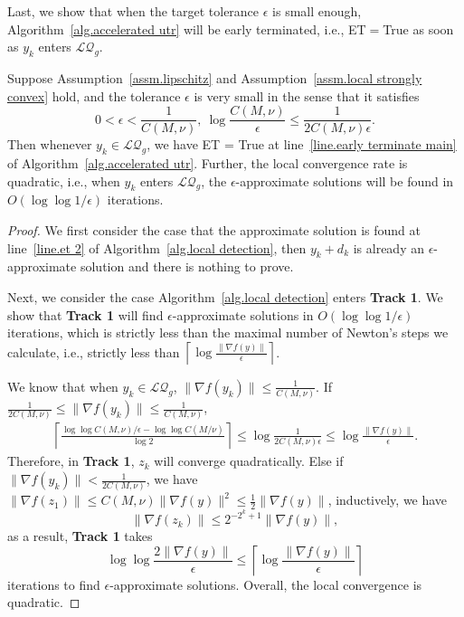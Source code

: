 \documentclass{mcom-l}
\numberwithin{equation}{section}
\begin{document}
Last, we show that when the target tolerance $\epsilon$ is small enough, Algorithm~\ref{alg.accelerated utr} will be early terminated, i.e., ET$=$True as soon as $y_k$ enters $\mathcal{LQ}_g$.
\begin{theorem}
    \label{thm.local quadratic convergence}
    Suppose Assumption~\ref{assm.lipschitz} and Assumption~\ref{assm.local strongly convex} hold, and the tolerance $\epsilon$ is very small in the sense that it satisfies
    \begin{equation}
        \label{eq.regularity epsilon}
        0<\epsilon< \frac{1}{C(M,\nu)}, \ \log\frac{C(M,\nu)}{\epsilon}\leq \frac{1}{2C(M,\nu)\epsilon}.
    \end{equation}
    Then whenever $y_k\in\mathcal{LQ}_g$, we have ET = True at line~\ref{line.early terminate main} of Algorithm~\ref{alg.accelerated utr}. Further, the local convergence rate is quadratic, i.e., when $y_k$ enters $\mathcal{LQ}_g$, the $\epsilon$-approximate solutions will be found in $O(\log\log1/\epsilon)$ iterations.
\end{theorem}
\begin{proof}
    We first consider the case that the approximate solution is found at line~\ref{line.et 2} of Algorithm~\ref{alg.local detection}, then $y_k+d_k$ is already an $\epsilon$-approximate solution and there is nothing to prove.

    Next, we consider the case Algorithm~\ref{alg.local detection} enters \textbf{Track 1}. We show that \textbf{Track 1} will find $\epsilon$-approximate solutions in $O(\log\log 1/\epsilon)$ iterations, which is strictly less than the maximal number of Newton's steps we calculate, i.e., strictly less than $\left \lceil\log\frac{\|\nabla f(y)\|}{\epsilon} \right\rceil$.

    We know that when $y_k\in\mathcal{LQ}_g$, $\|\nabla f(y_k)\|\leq \frac{1}{C(M,\nu)}$. If $\frac{1}{2C(M,\nu)}\leq \|\nabla f(y_k)\|\leq \frac{1}{C(M,\nu)}$,
    \begin{equation*}
        \begin{aligned}
            \left\lceil\frac{\log\log C(M,\nu)/\epsilon-\log\log C(M/\nu)}{\log2}\right\rceil\leq\log\frac{1}{2C(M,\nu)\epsilon}\leq\log\frac{\|\nabla f(y)\|}{\epsilon}.
        \end{aligned}
    \end{equation*}
    Therefore, in \textbf{Track 1}, $z_k$ will converge quadratically. Else if $\|\nabla f(y_k)\|< \frac{1}{2C(M,\nu)}$, we have $\|\nabla f(z_1)\|\leq C(M,\nu)\|\nabla f(y)\|^2\leq \frac{1}{2}\|\nabla f(y)\|$, inductively, we have
    \begin{equation*}
        \|\nabla f(z_k)\| \leq 2^{-2^k+1}\|\nabla f(y)\|,
    \end{equation*}
    as a result, \textbf{Track 1} takes
    \begin{equation*}
        \log\log\frac{2\|\nabla f(y)\|}{\epsilon}\leq \left \lceil \log\frac{\|\nabla f(y)\|}{\epsilon}\right \rceil
    \end{equation*}
    iterations to find $\epsilon$-approximate solutions. Overall, the local convergence is quadratic.
\end{proof}
\end{document}
